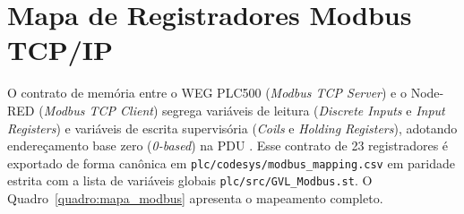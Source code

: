 \section{Mapa de Registradores Modbus TCP/IP}
\label{sec:arq_modbus}

O contrato de memória entre o WEG PLC500 (\textit{Modbus TCP Server}) e o Node-RED (\textit{Modbus TCP Client}) segrega variáveis de leitura (\textit{Discrete Inputs} e \textit{Input Registers}) e variáveis de escrita supervisória (\textit{Coils} e \textit{Holding Registers}), adotando endereçamento base zero (\textit{0-based}) na PDU \cite{modbus_app_v11b3}. Esse contrato de 23 registradores é exportado de forma canônica em \texttt{plc/codesys/modbus\_mapping.csv} em paridade estrita com a lista de variáveis globais \texttt{plc/src/GVL\_Modbus.st}. O Quadro~\ref{quadro:mapa_modbus} apresenta o mapeamento completo.

